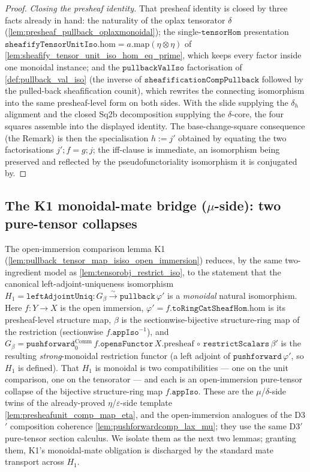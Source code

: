 \begin{proof}
  \emph{Closing the presheaf identity.} That presheaf identity is closed by three facts
  already in hand: the naturality of the oplax tensorator \(\delta\)
  (\cref{lem:presheaf_pullback_oplaxmonoidal}); the single-\(\mathtt{tensorHom}\)
  presentation \(\mathtt{sheafifyTensorUnitIso}.\mathrm{hom} = a.\mathrm{map}(\eta\otimes\eta)\)
  of \cref{lem:sheafify_tensor_unit_iso_hom_eq_prime}, which keeps every factor inside one
  monoidal instance; and the \(\mathtt{pullbackValIso}\) factorisation of
  \cref{def:pullback_val_iso} (the inverse of \(\mathtt{sheafificationCompPullback}\) followed
  by the pulled-back sheafification counit), which rewrites the connecting isomorphism into
  the same presheaf-level form on both sides. With the slide supplying the \(\delta_h\)
  alignment and the closed Sq2b decomposition supplying the \(\delta\)-core, the four squares
  assemble into the displayed identity. The base-change-square consequence (the Remark) is
  then the specialisation \(h := j'\) obtained by equating the two factorisations
  \(j' \mathbin{;} f = g \mathbin{;} j\); the iff-clause is immediate, an isomorphism being
  preserved and reflected by the pseudofunctoriality isomorphism it is conjugated by.
\end{proof}

\subsection{The K1 monoidal-mate bridge ($\mu$-side): two pure-tensor collapses}

The open-immersion comparison lemma K1 (\cref{lem:pullback_tensor_map_isiso_open_immersion})
reduces, by the same two-ingredient model as \cref{lem:tensorobj_restrict_iso}, to the
statement that the canonical left-adjoint-uniqueness isomorphism
\(H_1 = \mathtt{leftAdjointUniq} : G_\beta \xrightarrow{\sim} \mathtt{pullback}\,\varphi'\) is a
\emph{monoidal} natural isomorphism. Here \(f : Y \to X\) is the open immersion,
\(\varphi' = f.\mathtt{toRingCatSheafHom}.\mathrm{hom}\) is its presheaf-level structure map,
\(\beta\) is the sectionwise-bijective structure-ring map of the restriction (sectionwise
\(f.\mathtt{appIso}^{-1}\)), and
\(G_\beta = \mathtt{pushforward}_0^{\mathrm{Comm}}\,f.\mathtt{opensFunctor}\,X.\mathrm{presheaf}
\,\circ\, \mathtt{restrictScalars}\,\beta'\) is the resulting \emph{strong}-monoidal restriction
functor (a left adjoint of \(\mathtt{pushforward}\,\varphi'\), so \(H_1\) is defined). That \(H_1\)
is monoidal is two compatibilities --- one on the unit comparison, one on the tensorator --- and
each is an open-immersion pure-tensor collapse of the bijective structure-ring map
\(f.\mathtt{appIso}\). These are the $\mu$/$\delta$-side twins of the already-proved $\eta$/$\varepsilon$-side
template \cref{lem:presheafunit_comp_map_eta}, and the open-immersion analogues of the D3$'$
composition coherence \cref{lem:pushforwardcomp_lax_mu}; they use the same D3$'$ pure-tensor
section calculus. We isolate them as the next two lemmas; granting them, K1's
monoidal-mate obligation is discharged by the standard mate transport across \(H_1\).

